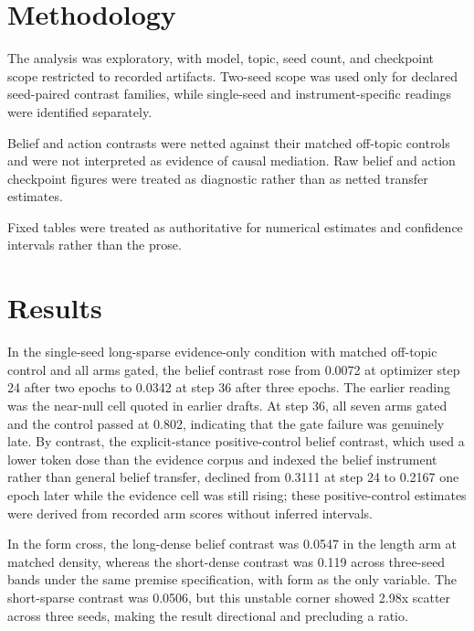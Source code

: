\documentclass[10pt]{article}
\begin{document}
\section{ Methodology }
\label{sec:methodology}

The analysis was exploratory, with model, topic, seed count, and checkpoint scope restricted to recorded artifacts. Two-seed scope was used only for declared seed-paired contrast families, while single-seed and instrument-specific readings were identified separately.



Belief and action contrasts were netted against their matched off-topic controls and were not interpreted as evidence of causal mediation. Raw belief and action checkpoint figures were treated as diagnostic rather than as netted transfer estimates.



Fixed tables were treated as authoritative for numerical estimates and confidence intervals rather than the prose.






\section{ Results }
\label{sec:results}

In the single-seed long-sparse evidence-only condition with matched off-topic control and all arms gated, the belief contrast rose from 0.0072 at optimizer step 24 after two epochs to 0.0342 at step 36 after three epochs. The earlier reading was the near-null cell quoted in earlier drafts. At step 36, all seven arms gated and the control passed at 0.802, indicating that the gate failure was genuinely late. By contrast, the explicit-stance positive-control belief contrast, which used a lower token dose than the evidence corpus and indexed the belief instrument rather than general belief transfer, declined from 0.3111 at step 24 to 0.2167 one epoch later while the evidence cell was still rising; these positive-control estimates were derived from recorded arm scores without inferred intervals.



In the form cross, the long-dense belief contrast was 0.0547 in the length arm at matched density, whereas the short-dense contrast was 0.119 across three-seed bands under the same premise specification, with form as the only variable. The short-sparse contrast was 0.0506, but this unstable corner showed 2.98x scatter across three seeds, making the result directional and precluding a ratio.
\end{document}
